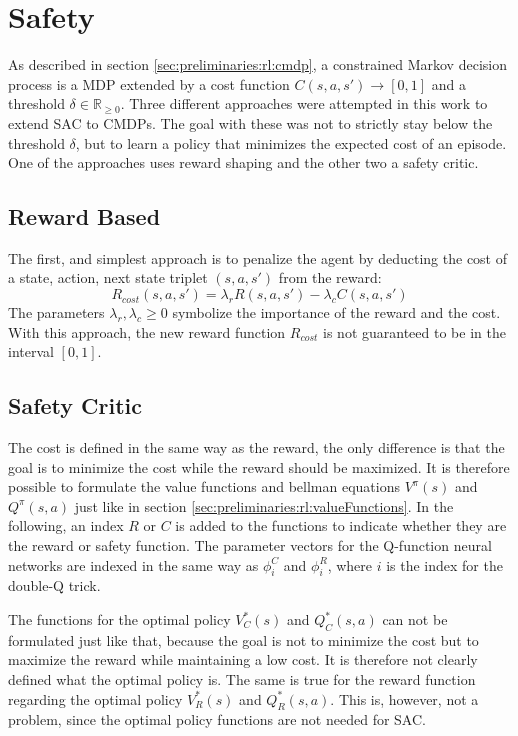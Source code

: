 \section{Safety}
\label{sec:safety}

As described in section \ref{sec:preliminaries:rl:cmdp}, a constrained Markov decision process is a MDP extended by a cost function $C(s,a,s')\rightarrow[0,1]$ and a threshold $\delta \in \mathbb{R}_{\geq 0}$. Three different approaches were attempted in this work to extend SAC to CMDPs. The goal with these was not to strictly stay below the threshold $\delta$, but to learn a policy that minimizes the expected cost of an episode. One of the approaches uses reward shaping and the other two a safety critic.

\subsection{Reward Based}
\label{sec:reward-based}

The first, and simplest approach is to penalize the agent by deducting the cost of a state, action, next state triplet $(s, a, s')$ from the reward:
\begin{equation}
    \label{eq:reward-based-cost}
    R_{cost}(s,a,s') = \lambda_r R(s,a,s') - \lambda_c C(s,a,s')
\end{equation}
The parameters $\lambda_r, \lambda_c \geq 0$ symbolize the importance of the reward and the cost. With this approach, the new reward function $R_{cost}$ is not guaranteed to be in the interval $[0,1]$.

\subsection{Safety Critic}
\label{sec:safety-critic}

The cost is defined in the same way as the reward, the only difference is that the goal is to minimize the cost while the reward should be maximized. It is therefore possible to formulate the value functions and bellman equations $V^\pi(s)$ and $Q^\pi(s,a)$ just like in section \ref{sec:preliminaries:rl:valueFunctions}. In the following, an index $R$ or $C$ is added to the functions to indicate whether they are the reward or safety function. The parameter vectors for the Q-function neural networks are indexed in the same way as $\phi^C_i$ and $\phi^R_i$, where $i$ is the index for the double-Q trick. 

The functions for the optimal policy $V_C^*(s)$ and $Q_C^*(s,a)$ can not be formulated just like that, because the goal is not to minimize the cost but to maximize the reward while maintaining a low cost. It is therefore not clearly defined what the optimal policy is. The same is true for the reward function regarding the optimal policy $V_R^*(s)$ and $Q_R^*(s,a)$. This is, however, not a problem, since the optimal policy functions are not needed for SAC.

